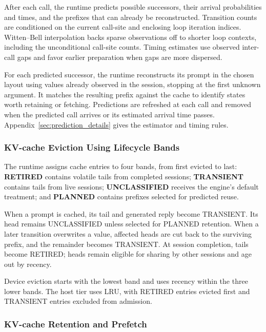 After each call, the runtime predicts possible successors, their arrival probabilities and times, and the prefixes that can already be reconstructed. Transition counts are conditioned on the current call-site and enclosing loop iteration indices. Witten--Bell interpolation backs sparse observations off to shorter loop contexts, including the unconditional call-site counts. Timing estimates use observed inter-call gaps and favor earlier preparation when gaps are more dispersed.

For each predicted successor, the runtime reconstructs its prompt in the chosen layout using values already observed in the session, stopping at the first unknown argument. It matches the resulting prefix against the cache to identify states worth retaining or fetching. Predictions are refreshed at each call and removed when the predicted call arrives or its estimated arrival time passes. Appendix~\ref{sec:prediction_details} gives the estimator and timing rules.

\subsubsection{KV-cache Eviction Using Lifecycle Bands}

The runtime assigns cache entries to four bands, from first evicted to last: \textbf{RETIRED} contains volatile tails from completed sessions; \textbf{TRANSIENT} contains tails from live sessions; \textbf{UNCLASSIFIED} receives the engine's default treatment; and \textbf{PLANNED} contains prefixes selected for predicted reuse.

When a prompt is cached, its tail and generated reply become TRANSIENT. Its head remains UNCLASSIFIED unless selected for PLANNED retention. When a later transition overwrites a value, affected heads are cut back to the surviving prefix, and the remainder becomes TRANSIENT. At session completion, tails become RETIRED; heads remain eligible for sharing by other sessions and age out by recency.

Device eviction starts with the lowest band and uses recency within the three lower bands. The host tier uses LRU, with RETIRED entries evicted first and TRANSIENT entries excluded from admission.

\subsubsection{KV-cache Retention and Prefetch}

